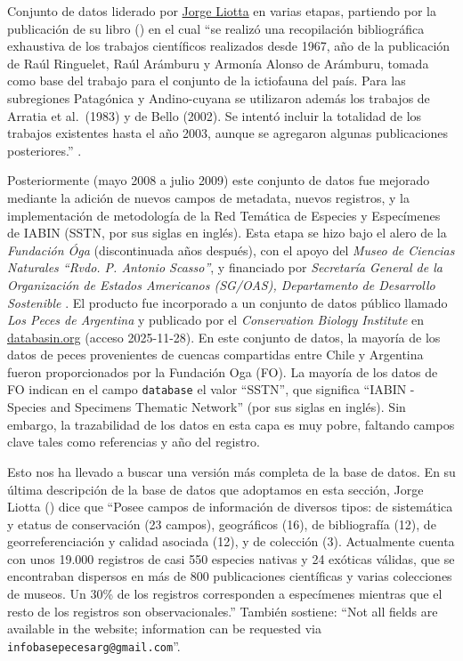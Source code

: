\documentclass[sn-apa,pdflatex]{sn-jnl}
\begin{document}
Conjunto de datos liderado por
\href{https://orcid.org/0000-0002-9053-9274}{Jorge Liotta} en varias
etapas, partiendo por la publicación de su libro (\citet{Liotta2006}) en
el cual ``se realizó una recopilación bibliográfica exhaustiva de los
trabajos científicos realizados desde 1967, año de la publicación de
Raúl Ringuelet, Raúl Arámburu y Armonía Alonso de Arámburu, tomada como
base del trabajo para el conjunto de la ictiofauna del país. Para las
subregiones Patagónica y Andino-cuyana se utilizaron además los trabajos
de Arratia et al.~(1983) y de Bello (2002). Se intentó incluir la
totalidad de los trabajos existentes hasta el año 2003, aunque se
agregaron algunas publicaciones posteriores.'' \citep{Liotta2006}.

Posteriormente (mayo 2008 a julio 2009) este conjunto de datos fue
mejorado mediante la adición de nuevos campos de metadata, nuevos
registros, y la implementación de metodología de la Red Temática de
Especies y Especímenes de IABIN (SSTN, por sus siglas en inglés). Esta
etapa se hizo bajo el alero de la \emph{Fundación Óga} (discontinuada
años después), con el apoyo del \emph{Museo de Ciencias Naturales
``Rvdo. P. Antonio Scasso''}, y financiado por \emph{Secretaría General
de la Organización de Estados Americanos (SG/OAS), Departamento de
Desarrollo Sostenible} \citep{Liotta2009}. El producto fue incorporado a
un conjunto de datos público llamado \emph{Los Peces de Argentina} y
publicado por el \emph{Conservation Biology Institute} en
\href{https://databasin.org/datasets/a990e5f4d70a4cd1b040b7ceb6c22904/}{databasin.org}
(acceso 2025-11-28). En este conjunto de datos, la mayoría de los datos
de peces provenientes de cuencas compartidas entre Chile y Argentina
fueron proporcionados por la Fundación Oga (FO). La mayoría de los datos
de FO indican en el campo \texttt{database} el valor ``SSTN'', que
significa ``IABIN - Species and Specimens Thematic Network'' (por sus
siglas en inglés). Sin embargo, la trazabilidad de los datos en esta
capa es muy pobre, faltando campos clave tales como referencias y año
del registro.

Esto nos ha llevado a buscar una versión más completa de la base de
datos. En su última descripción de la base de datos que adoptamos en
esta sección, Jorge Liotta (\citet{Liotta2020}) dice que ``Posee campos
de información de diversos tipos: de sistemática y etatus de
conservación (23 campos), geográficos (16), de bibliografía (12), de
georreferenciación y calidad asociada (12), y de colección (3).
Actualmente cuenta con unos 19.000 registros de casi 550 especies
nativas y 24 exóticas válidas, que se encontraban dispersos en más de
800 publicaciones científicas y varias colecciones de museos. Un 30\% de
los registros corresponden a especímenes mientras que el resto de los
registros son observacionales.'' También sostiene: ``Not all fields are
available in the website; information can be requested via
\texttt{infobasepecesarg@gmail.com}''.
\end{document}
